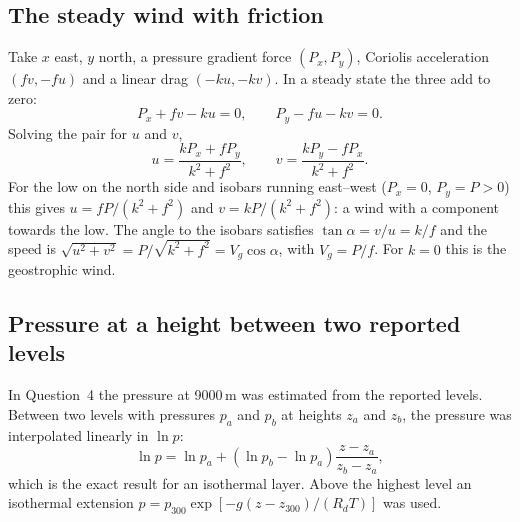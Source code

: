 \subsection{The steady wind with friction}

Take $x$ east, $y$ north, a pressure gradient force $(P_x,P_y)$, Coriolis acceleration $(fv,-fu)$ and a linear drag $(-ku,-kv)$. In a steady state the three add to zero:
\[
P_x+fv-ku=0,\qquad P_y-fu-kv=0 .
\]
Solving the pair for $u$ and $v$,
\[
u=\frac{kP_x+fP_y}{k^2+f^2},\qquad v=\frac{kP_y-fP_x}{k^2+f^2}.
\]
For the low on the north side and isobars running east--west ($P_x=0$, $P_y=P>0$) this gives $u=fP/(k^2+f^2)$ and $v=kP/(k^2+f^2)$: a wind with a component towards the low. The angle to the isobars satisfies $\tan\alpha=v/u=k/f$ and the speed is $\sqrt{u^2+v^2}=P/\sqrt{k^2+f^2}=V_g\cos\alpha$, with $V_g=P/f$. For $k=0$ this is the geostrophic wind.

\subsection{Pressure at a height between two reported levels}

In Question~4 the pressure at 9000\,m was estimated from the reported levels. Between two levels with pressures $p_a$ and $p_b$ at heights $z_a$ and $z_b$, the pressure was interpolated linearly in $\ln p$:
\[
\ln p=\ln p_a+(\ln p_b-\ln p_a)\frac{z-z_a}{z_b-z_a},
\]
which is the exact result for an isothermal layer. Above the highest level an isothermal extension $p=p_{300}\exp[-g(z-z_{300})/(R_dT)]$ was used.

